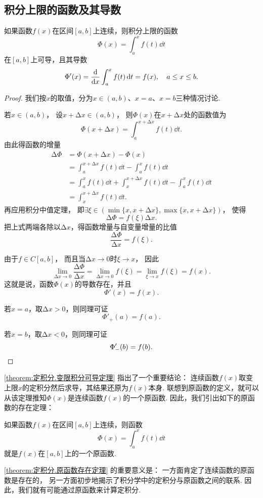 \subsection{积分上限的函数及其导数}
\begin{theorem}[变限积分可导定理]\label{theorem:定积分.变限积分可导定理}
如果函数\(f(x)\)在区间\([a,b]\)上连续，则积分上限的函数\[
	\Phi(x)
	= \int_a^x f(t)\dd{t}
\]在\([a,b]\)上可导，且其导数\[
	\Phi'(x)
	= \dv{x} \int_a^x f(t) \dd{t}
	= f(x),
	\quad a \leq x \leq b.
\]
\begin{proof}
我们按\(x\)的取值，分为\(x\in(a,b)\)、\(x=a\)、\(x=b\)三种情况讨论.

若\(x\in(a,b)\)，
设\(x + \increment x \in (a,b)\)，
则\(\Phi(x)\)在\(x + \increment x\)处的函数值为\[
	\Phi(x + \increment x) = \int_a^{x+\increment x} f(t) \dd{t}.
\]
由此得函数的增量
\begin{align*}
	\increment\Phi
	&= \Phi(x + \increment x) - \Phi(x) \\
	&= \int_a^{x+\increment x} f(t) \dd{t} - \int_a^x f(t) \dd{t} \\
	&= \int_a^x f(t) \dd{t} + \int_x^{x+\increment x} f(t) \dd{t} - \int_a^x f(t) \dd{t} \\
	&= \int_x^{x+\increment x} f(t) \dd{t}.
\end{align*}
再应用积分中值定理，
即\(\exists\xi\in( \min\{x,x+\increment x\}, \max\{x,x+\increment x\} )\)，
使得\[
	\increment\Phi = f(\xi) \increment x.
\]
把上式两端各除以\(\increment x\)，得函数增量与自变量增量的比值\[
	\frac{\increment\Phi}{\increment x} = f(\xi).
\]

由于\(f \in C[a,b]\)，
而且当\(\increment x\to0\)时\(\xi \to x\)，
因此\[
	\lim_{\increment x\to0} \frac{\increment\Phi}{\increment x}
	= \lim_{\increment x\to0} f(\xi)
	= \lim_{\xi \to x} f(\xi)
	= f(x).
\]
这就是说，函数\(\Phi(x)\)的导数存在，并且\[
	\Phi'(x) = f(x).
\]

若\(x = a\)，取\(\increment x > 0\)，则同理可证
\[
	\Phi'_+(a)=f(a).
\]

若\(x = b\)，取\(\increment x < 0\)，则同理可证
\[
	\Phi'_-(b)=f(b).
	\qedhere
\]
\end{proof}
\end{theorem}
\cref{theorem:定积分.变限积分可导定理} 指出了一个重要结论：
连续函数\(f(x)\)取变上限\(x\)的定积分然后求导，其结果还原为\(f(x)\)本身.
联想到原函数的定义，就可以从该定理推知\(\Phi(x)\)是连续函数\(f(x)\)的一个原函数.
因此，我们引出如下的原函数的存在定理：
\begin{theorem}[原函数存在定理]\label{theorem:定积分.原函数存在定理}
如果函数\(f(x)\)在区间\([a,b]\)上连续，则函数\[
\Phi(x) = \int_a^x f(t) \dd{t}
\]就是\(f(x)\)在\([a,b]\)上的一个原函数.
\end{theorem}
\cref{theorem:定积分.原函数存在定理} 的重要意义是：
一方面肯定了连续函数的原函数是存在的，
另一方面初步地揭示了积分学中的定积分与原函数之间的联系.
因此，我们就有可能通过原函数来计算定积分.

